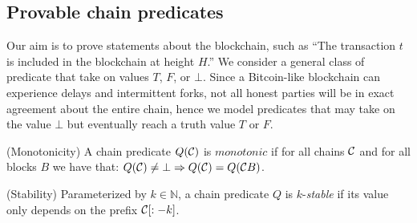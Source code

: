 \subsection{Provable chain predicates}

Our aim is to prove statements about the blockchain, such as ``The transaction $t$ is included in the blockchain at height $H$.'' We consider a general class of predicate that take on values $T$, $F$, or $\bot$.
  Since a Bitcoin-like blockchain can experience delays and intermittent forks, not all honest parties will be in exact agreement about the entire chain, hence we model predicates that may take on the value $\bot$ but eventually reach a truth value $T$ or $F$.

\begin{definition}{(Monotonicity)}
    A chain predicate $Q(\mathcal{C})$ is $\textit{monotonic}$ if for all chains
    $\mathcal{C}$ and for all blocks $B$ we have that:
    $Q(\mathcal{C}) \neq \bot \Rightarrow Q(\mathcal{C}) = Q(\mathcal{C} B)$.
\end{definition}

\begin{definition}{(Stability)}
    Parameterized by $k \in \mathbb{N}$, a chain predicate $Q$ is
    $k$-\emph{stable} if its value only depends on the prefix $\mathcal{C}[:-k]$.
\end{definition}
%

